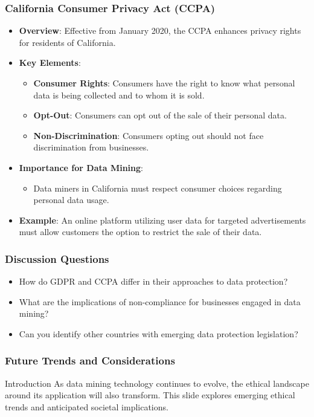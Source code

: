 \documentclass{beamer}
\begin{document}
\begin{frame}[fragile]
    \frametitle{California Consumer Privacy Act (CCPA)}
    \begin{itemize}
        \item \textbf{Overview}: Effective from January 2020, the CCPA enhances privacy rights for residents of California.
        
        \item \textbf{Key Elements}:
        \begin{itemize}
            \item \textbf{Consumer Rights}: Consumers have the right to know what personal data is being collected and to whom it is sold.
            \item \textbf{Opt-Out}: Consumers can opt out of the sale of their personal data.
            \item \textbf{Non-Discrimination}: Consumers opting out should not face discrimination from businesses.
        \end{itemize}

        \item \textbf{Importance for Data Mining}:
        \begin{itemize}
            \item Data miners in California must respect consumer choices regarding personal data usage.
        \end{itemize}
    
        \item \textbf{Example}: An online platform utilizing user data for targeted advertisements must allow customers the option to restrict the sale of their data.
    \end{itemize}
\end{frame}

\begin{frame}[fragile]
    \frametitle{Discussion Questions}
    \begin{itemize}
        \item How do GDPR and CCPA differ in their approaches to data protection?
        \item What are the implications of non-compliance for businesses engaged in data mining?
        \item Can you identify other countries with emerging data protection legislation?
    \end{itemize}
\end{frame}

\begin{frame}[fragile]
    \frametitle{Future Trends and Considerations}
    \begin{block}{Introduction}
        As data mining technology continues to evolve, the ethical landscape around its application will also transform. This slide explores emerging ethical trends and anticipated societal implications.
    \end{block}
\end{frame}
\end{document}
